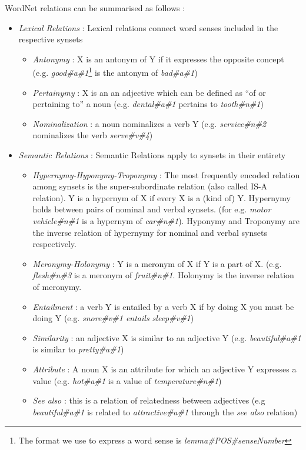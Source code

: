 \noindent
WordNet relations can be summarised as follows :
\begin{itemize}
\item \textit{Lexical Relations} : Lexical relations connect word senses included in the respective synsets
  \begin{itemize}
  \item \textit{Antonymy} : X is an antonym of Y if it expresses the opposite concept (e.g. \textit{good\#a\#1}\footnote{The format we use to express a word sense is \textit{lemma\#POS\#senseNumber}} is the antonym of \textit{bad\#a\#1})
  \item \textit{Pertainymy} : X is an an adjective which can be defined as ``of or pertaining to'' a noun (e.g. \textit{dental\#a\#1} pertains to \textit{tooth\#n\#1})
  \item \textit{Nominalization} : a noun nominalizes a verb Y (e.g. \textit{service\#n\#2} nominalizes the verb \textit{serve\#v\#4})
  \end{itemize}
\item \textit{Semantic Relations} : Semantic Relations apply to synsets in their entirety
  \begin{itemize}
  \item \textit{Hypernymy-Hyponymy-Troponymy} : The most frequently encoded relation among synsets is the super-subordinate relation (also called IS-A relation).
  Y is a hypernym of X if every X is a (kind of) Y. Hypernymy holds between pairs of nominal and verbal synsets. (for e.g. \textit{motor vehicle\#n\#1} is a hypernym of \textit{car\#n\#1}).
  Hyponymy and Troponymy are the inverse relation of hypernymy for nominal and verbal synsets respectively.
  \item \textit{Meronymy-Holonymy} : Y is a meronym of X if Y is a part of X. (e.g. \textit{flesh\#n\#3} is a meronym of \textit{fruit\#n\#1}.
  Holonymy is the inverse relation of meronymy.
  \item \textit{Entailment} : a verb Y is entailed by a verb X if by doing X you must be doing Y (e.g. \textit{snore\#v\#1 entails sleep\#v\#1})
  \item \textit{Similarity} : an adjective X is similar to an adjective Y (e.g. \textit{beautiful\#a\#1} is similar to \textit{pretty\#a\#1})
  \item \textit{Attribute} : A noun X is an attribute for which an adjective Y expresses a value (e.g. \textit{hot\#a\#1} is a value of \textit{temperature\#n\#1})
  \item \textit{See also} : this is a relation of relatedness between adjectives (e.g \textit{beautiful\#a\#1} is related to \textit{attractive\#a\#1} through the \textit{see also} relation)
  \end{itemize}  
\end{itemize}

